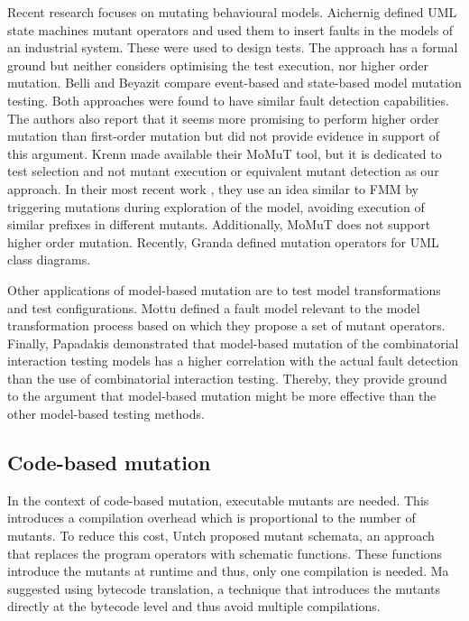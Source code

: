 Recent research focuses on mutating behavioural models. Aichernig \etal \cite{Aichernig2014a,Aichernig2015,Aichernig2014} defined UML state machines mutant operators and used them to insert faults in the models of an industrial system. These were used to design tests. The approach has a formal ground but neither considers optimising the test execution, nor higher order mutation. 
Belli and Beyazit \cite{Belli2006,Belli2011d} compare event-based and state-based model mutation testing. Both approaches were found to have similar fault detection capabilities. The authors also report that it seems more promising to perform higher order mutation than first-order mutation but did not provide evidence in support of this argument. Krenn \etal \cite{Krenn2015} made available their MoMuT tool, but it is dedicated to test selection and not mutant execution or equivalent mutant detection as our approach. In their most recent work \cite{Krenn2016}, they use an idea similar to FMM by triggering mutations during exploration of the model, avoiding execution of similar prefixes in different mutants. Additionally, MoMuT does not support higher order mutation. Recently, Granda \etal \cite{Granda2016} defined mutation operators for UML class diagrams.

Other applications of model-based mutation are to test model transformations and test configurations. Mottu \etal \cite{Mottu2006} defined a fault model relevant to the model transformation process based on which they propose a set of mutant operators.
Finally, Papadakis \etal \cite{Papadakis2014} demonstrated that model-based mutation of the combinatorial interaction testing models has a higher correlation with the actual fault detection than the use of combinatorial interaction testing. Thereby, they provide ground to the argument that model-based mutation might be more effective than the other model-based testing methods. 

\subsection{Code-based mutation}

In the context of code-based mutation, executable mutants are needed. This introduces a compilation overhead which is proportional to the number of mutants. To reduce this cost, Untch \etal \cite{Untch1993} proposed mutant schemata, an approach that replaces the program operators with schematic functions. These functions introduce the mutants at runtime and thus, only one compilation is needed. Ma \etal \cite{Ma2005} suggested using bytecode translation, a technique that introduces the mutants directly at the bytecode level and thus avoid multiple compilations. 

